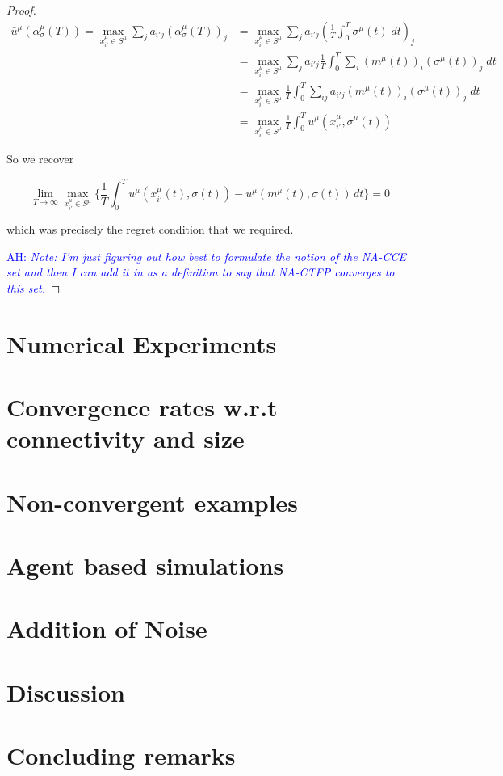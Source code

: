 \documentclass{article}
\theoremstyle{definition}
\newcommand{\ah}[1]{\textcolor{blue}{AH: \textit{#1}}}
\begin{document}
\begin{proof}
		\begin{align}
			\bar{u}^\mu (\alpha_\sigma^\mu (T)) = \max_{x^\mu_{i'} \in S^\mu} \sum_{j} a_{i'j} (\alpha_{\sigma}^\mu (T))_j & = \max_{x^\mu_{i'} \in S^\mu} \sum_{j} a_{i'j} (\frac{1}{T} \int_{0}^{T} \sigma^\mu(t) \; dt)_j \\
			& = \max_{x^\mu_{i'} \in S^\mu} \sum_{j} a_{i'j} \frac{1}{T} \int_{0}^{T} \sum_i (m^\mu (t))_i (\sigma^\mu(t))_j \; dt\\
			& = \max_{x^\mu_{i'} \in S^\mu} \frac{1}{T} \int_0^T \sum_{ij} a_{i'j} (m^\mu (t))_i (\sigma^\mu(t))_j \; dt\\
			& = \max_{x^\mu_{i'} \in S^\mu} \frac{1}{T} \int_0^T u^\mu(x^\mu_{i'}, \sigma^\mu(t))
		\end{align}

		So we recover

		\begin{equation}
			\lim_{T \rightarrow \infty} \max_{x_{i'}^\mu \in S^\mu} \Big\{ \frac{1}{T} \int_{0}^{T} u^{\mu}(x_{i'}^\mu(t), \sigma(t)) - u^{\mu}(m^\mu(t), \sigma(t)) \, dt \Big\} = 0
		\end{equation}

		which was precisely the regret condition that we required.

		\ah{Note: I'm just figuring out how best to formulate the notion of the NA-CCE set and then I can add it in as a definition to say that NA-CTFP converges to this set.}
	\end{proof}


	\section{Numerical Experiments}

	\section{Convergence rates w.r.t connectivity and size}
	\section{Non-convergent examples}
	\section{Agent based simulations}
	\section{Addition of Noise}

	\section{Discussion}

	\section{Concluding remarks}
\end{document}
